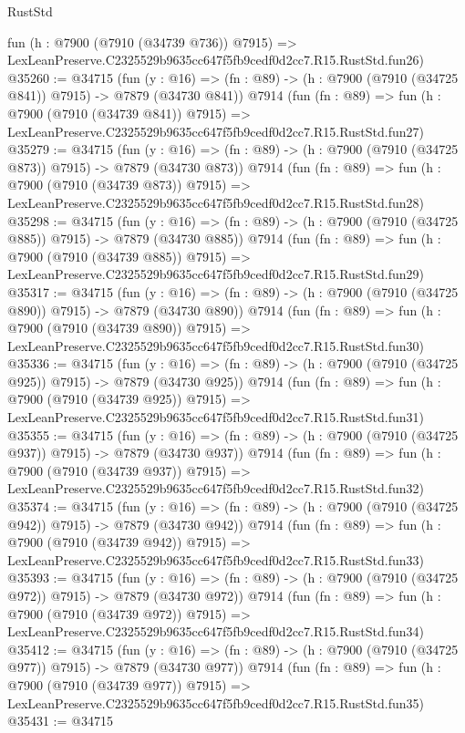 \begin{lexlean}{RustStd}
\begin{coremodule}
    fun (h : @7900 (@7910 (@34739 @736)) @7915) =>
    LexLeanPreserve.C2325529b9635cc647f5fb9cedf0d2cc7.R15.RustStd.fun26)
@35260 := @34715
    (fun (y : @16) => (fn : @89) -> (h : @7900 (@7910 (@34725 @841)) @7915) -> @7879 (@34730 @841))
    @7914
    (fun (fn : @89) =>
    fun (h : @7900 (@7910 (@34739 @841)) @7915) =>
    LexLeanPreserve.C2325529b9635cc647f5fb9cedf0d2cc7.R15.RustStd.fun27)
@35279 := @34715
    (fun (y : @16) => (fn : @89) -> (h : @7900 (@7910 (@34725 @873)) @7915) -> @7879 (@34730 @873))
    @7914
    (fun (fn : @89) =>
    fun (h : @7900 (@7910 (@34739 @873)) @7915) =>
    LexLeanPreserve.C2325529b9635cc647f5fb9cedf0d2cc7.R15.RustStd.fun28)
@35298 := @34715
    (fun (y : @16) => (fn : @89) -> (h : @7900 (@7910 (@34725 @885)) @7915) -> @7879 (@34730 @885))
    @7914
    (fun (fn : @89) =>
    fun (h : @7900 (@7910 (@34739 @885)) @7915) =>
    LexLeanPreserve.C2325529b9635cc647f5fb9cedf0d2cc7.R15.RustStd.fun29)
@35317 := @34715
    (fun (y : @16) => (fn : @89) -> (h : @7900 (@7910 (@34725 @890)) @7915) -> @7879 (@34730 @890))
    @7914
    (fun (fn : @89) =>
    fun (h : @7900 (@7910 (@34739 @890)) @7915) =>
    LexLeanPreserve.C2325529b9635cc647f5fb9cedf0d2cc7.R15.RustStd.fun30)
@35336 := @34715
    (fun (y : @16) => (fn : @89) -> (h : @7900 (@7910 (@34725 @925)) @7915) -> @7879 (@34730 @925))
    @7914
    (fun (fn : @89) =>
    fun (h : @7900 (@7910 (@34739 @925)) @7915) =>
    LexLeanPreserve.C2325529b9635cc647f5fb9cedf0d2cc7.R15.RustStd.fun31)
@35355 := @34715
    (fun (y : @16) => (fn : @89) -> (h : @7900 (@7910 (@34725 @937)) @7915) -> @7879 (@34730 @937))
    @7914
    (fun (fn : @89) =>
    fun (h : @7900 (@7910 (@34739 @937)) @7915) =>
    LexLeanPreserve.C2325529b9635cc647f5fb9cedf0d2cc7.R15.RustStd.fun32)
@35374 := @34715
    (fun (y : @16) => (fn : @89) -> (h : @7900 (@7910 (@34725 @942)) @7915) -> @7879 (@34730 @942))
    @7914
    (fun (fn : @89) =>
    fun (h : @7900 (@7910 (@34739 @942)) @7915) =>
    LexLeanPreserve.C2325529b9635cc647f5fb9cedf0d2cc7.R15.RustStd.fun33)
@35393 := @34715
    (fun (y : @16) => (fn : @89) -> (h : @7900 (@7910 (@34725 @972)) @7915) -> @7879 (@34730 @972))
    @7914
    (fun (fn : @89) =>
    fun (h : @7900 (@7910 (@34739 @972)) @7915) =>
    LexLeanPreserve.C2325529b9635cc647f5fb9cedf0d2cc7.R15.RustStd.fun34)
@35412 := @34715
    (fun (y : @16) => (fn : @89) -> (h : @7900 (@7910 (@34725 @977)) @7915) -> @7879 (@34730 @977))
    @7914
    (fun (fn : @89) =>
    fun (h : @7900 (@7910 (@34739 @977)) @7915) =>
    LexLeanPreserve.C2325529b9635cc647f5fb9cedf0d2cc7.R15.RustStd.fun35)
@35431 := @34715

\end{coremodule}
\end{lexlean}
